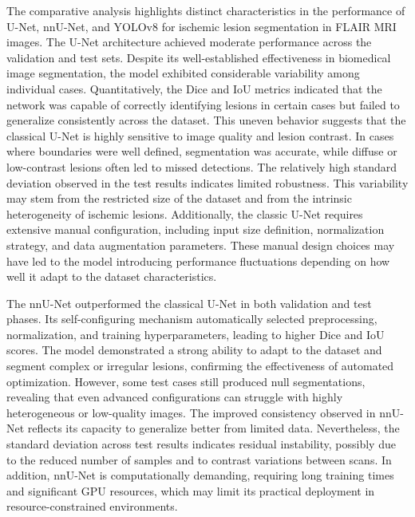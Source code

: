 \documentclass[12pt]{article}
\begin{document}
The comparative analysis highlights distinct characteristics in the performance of U-Net, nnU-Net, and YOLOv8 for ischemic lesion segmentation in FLAIR MRI images.
%
The U-Net architecture achieved moderate performance across the validation and test sets. Despite its well-established effectiveness in biomedical image segmentation, the model exhibited considerable variability among individual cases. Quantitatively, the Dice and IoU metrics indicated that the network was capable of correctly identifying lesions in certain cases but failed to generalize consistently across the dataset. This uneven behavior suggests that the classical U-Net is highly sensitive to image quality and lesion contrast. In cases where boundaries were well defined, segmentation was accurate, while diffuse or low-contrast lesions often led to missed detections.
%
The relatively high standard deviation observed in the test results indicates limited robustness. This variability may stem from the restricted size of the dataset and from the intrinsic heterogeneity of ischemic lesions. Additionally, the classic U-Net requires extensive manual configuration, including input size definition, normalization strategy, and data augmentation parameters. These manual design choices may have led to the model introducing performance fluctuations depending on how well it adapt to the dataset characteristics.

The nnU-Net outperformed the classical U-Net in both validation and test phases. Its self-configuring mechanism automatically selected preprocessing, normalization, and training hyperparameters, leading to higher Dice and IoU scores. The model demonstrated a strong ability to adapt to the dataset and segment complex or irregular lesions, confirming the effectiveness of automated optimization. However, some test cases still produced null segmentations, revealing that even advanced configurations can struggle with highly heterogeneous or low-quality images.
%
The improved consistency observed in nnU-Net reflects its capacity to generalize better from limited data. Nevertheless, the standard deviation across test results indicates residual instability, possibly due to the reduced number of samples and to contrast variations between scans. In addition, nnU-Net is computationally demanding, requiring long training times and significant GPU resources, which may limit its practical deployment in resource-constrained environments.
\end{document}
